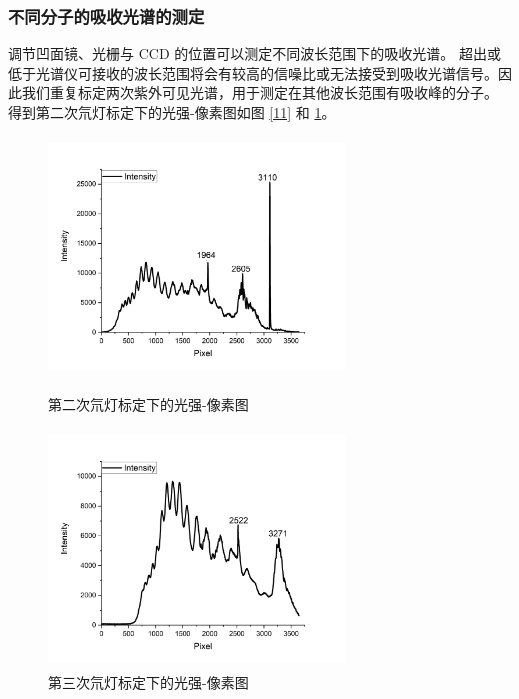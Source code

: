 \documentclass[cn,hazy,pku,12pt,normal,math=newtx,cite=super]{elegantnote}
\begin{document}
\subsubsection{不同分子的吸收光谱的测定}

调节凹面镜、光栅与 CCD 的位置可以测定不同波长范围下的吸收光谱。
超出或低于光谱仪可接收的波长范围将会有较高的信噪比或无法接受到吸收光谱信号。因此我们重复标定两次紫外可见光谱，用于测定在其他波长范围有吸收峰的分子。
得到第二次氘灯标定下的光强-像素图如图 \ref{11} 和 \ref{12}。

\begin{figure}[htbp]
    \begin{minipage}{0.49\textwidth}
        \centering
        \includegraphics[height = 2.5in,width = 3.1in]{image/2biaoding.png}
        \caption{第二次氘灯标定下的光强-像素图}\label{11}
    \end{minipage}
    \centering
    \begin{minipage}{0.49\textwidth}
        \centering
        \includegraphics[height = 2.5in,width = 3.1in]{image/3biaoding.png}
        \caption{第三次氘灯标定下的光强-像素图}\label{12}
    \end{minipage}
    \centering
\end{figure}
\end{document}
